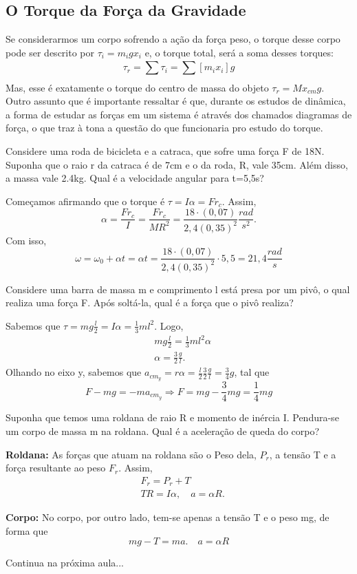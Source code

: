 \documentclass[physicsII_notes.tex]{subfiles}
\begin{document}
\subsection{O Torque da Força da Gravidade}
Se considerarmos um corpo sofrendo a ação da força peso, o torque desse corpo pode ser descrito por
\(\tau_{i} = m_{i}gx_{i}\) e, o torque total, será a soma desses torques:
\[
	\tau_{r} = \sum\limits_{}^{}\tau_{i} = \sum\limits_{}^{}[m_{i}x_{i}]g
\]
Mas, esse é exatamente o torque do centro de massa do objeto \(\tau_{r} = Mx_{cm}g\). Outro assunto que é
importante ressaltar é que, durante os estudos de dinâmica, a forma de estudar as forças em um sistema é através
dos chamados diagramas de força, o que traz à tona a questão do que funcionaria pro estudo do torque.
\begin{example}
	Considere uma roda de bicicleta e a catraca, que sofre uma força F de 18N. Suponha que o raio r
	da catraca é de 7cm e o da roda, R, vale 35cm. Além disso, a massa vale 2.4kg. Qual é a velocidade angular para t=5,5s?

	Começamos afirmando que o torque é \(\tau = I\alpha = Fr_{c}\). Assim,
	\[
		\alpha = \frac{Fr_{c}}{I} = \frac{Fr_{c}}{MR^{2}} = \frac{18 \cdot (0,07)}{2,4(0,35)^{2}}\frac{rad}{s^{2}}.
	\]
	Com isso,
	\[
		\omega = \omega_{0} + \alpha t = \alpha t = \frac{18 \cdot (0,07)}{2,4(0,35)^{2}} \cdot 5,5 = 21,4 \frac{rad}{s}
	\]
\end{example}
\begin{example}
	Considere uma barra de massa m e comprimento l está presa por um pivô, o qual realiza uma força F. Após soltá-la, qual é a força que o pivô realiza?

	Sabemos que \(\tau = mg \frac{l}{2} = I\alpha = \frac{1}{3}ml^{2}.\) Logo,
	\begin{align*}
		 & mg \frac{l}{2} = \frac{1}{3}ml^{2}\alpha \\
		 & \alpha = \frac{3}{2}\frac{g}{l}.
	\end{align*}
	Olhando no eixo y, sabemos que \(a_{cm_{y}} = r\alpha  = \frac{l}{2}\frac{3}{2}\frac{g}{l} = \frac{3}{4}g\), tal que
	\[
		F - mg = -ma_{cm_y} \Rightarrow F = mg - \frac{3}{4}mg = \frac{1}{4}mg
	\]
\end{example}
\begin{example}
	Suponha que temos uma roldana de raio R e momento de inércia I. Pendura-se um corpo de massa m na roldana. Qual é a aceleração de queda do corpo?

	\textbf{Roldana:}
	As forças que atuam na roldana são o Peso dela, \(P_{r}\), a tensão T
	e a força resultante ao peso \(F_{r}\). Assim,
	\begin{align*}
		 & F_{r} = P_{r} + T                \\
		 & TR = I\alpha,\quad a = \alpha R.
	\end{align*}

	\textbf{Corpo:}
	No corpo, por outro lado, tem-se apenas a tensão T e o peso mg, de forma que
	\[
		mg-T = ma.\quad a = \alpha R
	\]
\end{example}
Continua na próxima aula...
\end{document}
